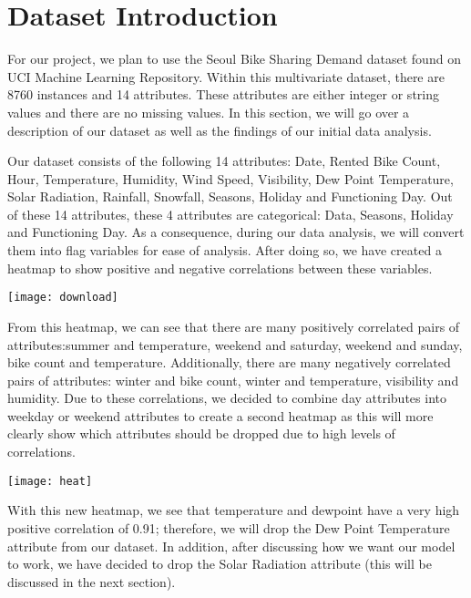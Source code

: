 \documentclass[main.tex]{subfiles}
\begin{document}
\maketitle 

\section{Dataset Introduction}
For our project, we plan to use the Seoul Bike Sharing Demand dataset found on UCI Machine Learning Repository. Within this multivariate dataset, there are 8760 instances and 14 attributes. These attributes are either integer or string values and there are no missing values. In this section, we will go over a description of our dataset as well as the findings of our initial data analysis. 

Our dataset consists of the following 14 attributes: Date, Rented Bike Count, Hour, Temperature, Humidity, Wind Speed, Visibility, Dew Point Temperature, Solar Radiation, Rainfall, Snowfall, Seasons, Holiday and Functioning Day. Out of these 14 attributes, these 4 attributes are categorical: Data, Seasons, Holiday and Functioning Day. As a consequence, during our data analysis, we will convert them into flag variables for ease of analysis. After doing so, we have created a heatmap to show positive and negative correlations between these variables. 

\texttt{[image: download]}

From this heatmap, we can see that there are many positively correlated pairs of attributes:summer and temperature, weekend and saturday, weekend and sunday, bike count and temperature. Additionally, there are many negatively correlated pairs of attributes: winter and bike count, winter and temperature, visibility and humidity. Due to these correlations, we decided to combine day attributes into weekday or weekend attributes to create a second heatmap as this will more clearly show which attributes should be dropped due to high levels of correlations. 

\texttt{[image: heat]}

With this new heatmap, we see that temperature and dewpoint have a very high positive correlation of 0.91; therefore, we will drop the Dew Point Temperature attribute from our dataset. In addition, after discussing how we want our model to work, we have decided to drop the Solar Radiation attribute (this will be discussed in the next section). 
\end{document}
